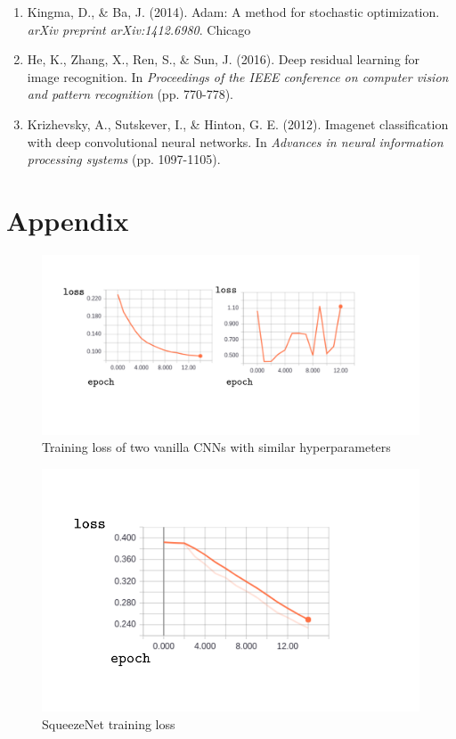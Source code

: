 \documentclass{article}
\begin{document}
{\begin{enumerate}
Chicago
\item Kingma, D., \& Ba, J. (2014). Adam: A method for stochastic optimization. \emph{arXiv preprint arXiv:1412.6980}.
Chicago	
\item He, K., Zhang, X., Ren, S., \& Sun, J. (2016). Deep residual learning for image recognition. In \emph{Proceedings of the IEEE conference on computer vision and pattern recognition} (pp. 770-778).
\item Krizhevsky, A., Sutskever, I., \& Hinton, G. E. (2012). Imagenet classification with deep convolutional neural networks. In \emph{Advances in neural information processing systems} (pp. 1097-1105).


\end{enumerate}
\pagebreak
\section*{Appendix}

\begin{figure}[h]
  \includegraphics[width=\linewidth]{loss.pdf}
  \caption{Training loss of two vanilla CNNs with similar hyperparameters}
  \label{fig:loss}
\end{figure}

\begin{figure}[h]
  \includegraphics[width=\linewidth]{squeezeloss.pdf}
  \caption{SqueezeNet training loss}
  \label{fig:squeezeloss}
\end{figure}

}
\end{document}
